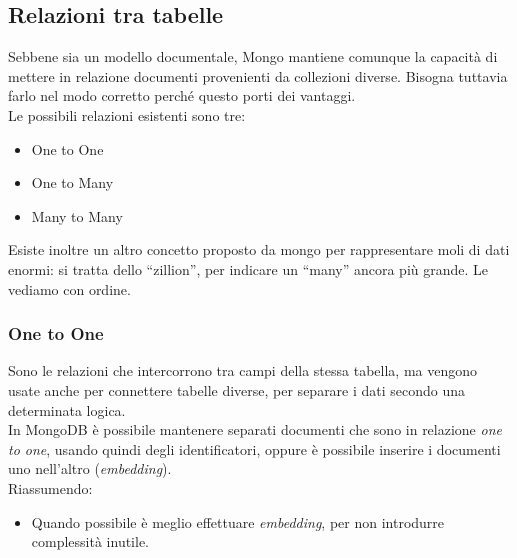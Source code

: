 \subsection{Relazioni tra tabelle}
Sebbene sia un modello documentale, Mongo mantiene comunque la capacità di mettere in relazione documenti provenienti da collezioni diverse. Bisogna tuttavia farlo nel modo corretto perché questo porti dei vantaggi.\\

\noindent Le possibili relazioni esistenti sono tre:
\begin{itemize}
    \item One to One
    \item One to Many
    \item Many to Many
\end{itemize}
Esiste inoltre un altro concetto proposto da mongo per rappresentare moli di dati enormi: si tratta dello ``zillion'', per indicare un ``many'' ancora più grande. Le vediamo con ordine.

\subsubsection{One to One}
Sono le relazioni che intercorrono tra campi della stessa tabella, ma vengono usate anche per connettere tabelle diverse, per separare i dati secondo una determinata logica.\\
In MongoDB è possibile mantenere separati documenti che sono in relazione \textit{one to one}, usando quindi degli identificatori, oppure è possibile inserire i documenti uno nell'altro (\textit{embedding}).\\
Riassumendo:
\begin{itemize}
    \item Quando possibile è meglio effettuare \textit{embedding}, per non introdurre complessità inutile.
\end{itemize}

